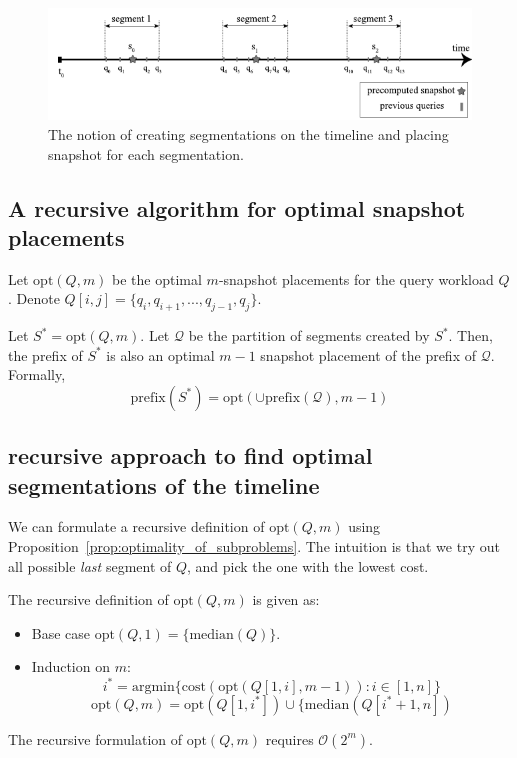 \begin{figure}
	\centering
	\includegraphics[width=\textwidth]{figs/segmentations.pdf}
	\caption{The notion of creating segmentations on the timeline and placing snapshot for each segmentation.}
	\label{fig:segmentation}
\end{figure}

\subsection{A recursive algorithm for optimal snapshot placements}

Let $\mathrm{opt}(Q, m)$ be the optimal $m$-snapshot placements for the query workload $Q$. Denote $Q[i,j] = \{q_i,q_{i+1},...,q_{j-1},q_j\}$.

\begin{prop}
	Let $S^* = \mathrm{opt}(Q, m)$.  Let $\mathcal{Q}$ be the partition of segments created by $S^*$.  Then, the prefix of $S^*$ is also an optimal $m-1$ snapshot placement of the prefix of $\mathcal{Q}$. Formally, $$\mathrm{prefix}(S^*) = \mathrm{opt}(\cup\mathrm{prefix}(\mathcal{Q}), m-1)$$
\label{prop:optimality_of_subproblems}
\end{prop}

\subsection{recursive approach to find optimal segmentations of the timeline}
We can formulate a recursive definition of $\mathrm{opt}(Q, m)$ using Proposition~\ref{prop:optimality_of_subproblems}. The intuition is that we try out all possible {\em last} segment of $Q$, and pick the one with the lowest cost.

The recursive definition of $\mathrm{opt}(Q, m)$ is given as:

\begin{itemize}
	\item Base case $ \mathrm{opt}(Q, 1) = \{\mathrm{median}(Q)\}$.
	\item Induction on $m$:
	$$i^* = \mathrm{argmin}\{\mathrm{cost}(\mathrm{opt}(Q[1,i], m-1)): i\in[1,
	n]\}$$
	$$
	\mathrm{opt}(Q, m) = \mathrm{opt}(Q[1, i^*]) \cup \{\mathrm{median}(Q[i^*+1, n])
	$$
\end{itemize}
The recursive formulation of $\mathrm{opt}(Q, m)$ requires $\mathcal{O}(2^{m})$.

